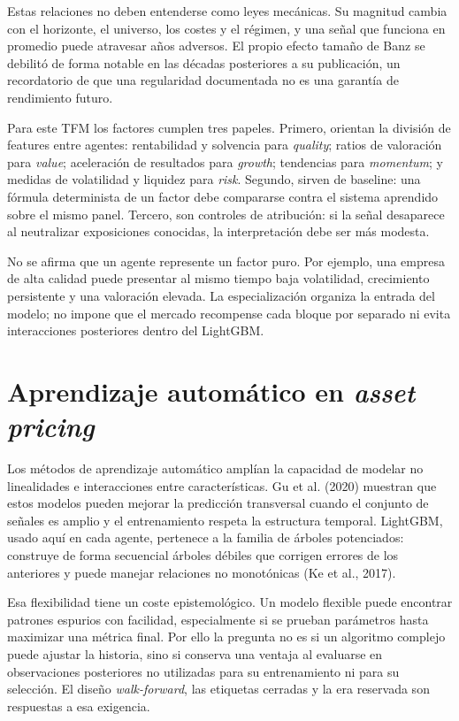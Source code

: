 Estas relaciones no deben entenderse como leyes mecánicas.
Su magnitud cambia con el horizonte, el universo, los costes y el régimen, y una señal que funciona
en promedio puede atravesar años adversos. El propio efecto tamaño de Banz se debilitó de forma
notable en las décadas posteriores a su publicación, un recordatorio de que una regularidad
documentada no es una garantía de rendimiento futuro.

Para este TFM los factores cumplen tres papeles. Primero, orientan la división de features entre
agentes: rentabilidad y solvencia para \textit{quality}; ratios de valoración para \textit{value};
aceleración de resultados para \textit{growth}; tendencias para \textit{momentum}; y medidas de
volatilidad y liquidez para \textit{risk}. Segundo, sirven de baseline: una fórmula determinista de
un factor debe compararse contra el sistema aprendido sobre el mismo panel. Tercero, son controles
de atribución: si la señal desaparece al neutralizar exposiciones conocidas, la interpretación debe
ser más modesta.

No se afirma que un agente represente un factor puro. Por ejemplo, una empresa de alta calidad puede
presentar al mismo tiempo baja volatilidad, crecimiento persistente y una valoración elevada. La
especialización organiza la entrada del modelo; no impone que el mercado recompense cada bloque por
separado ni evita interacciones posteriores dentro del LightGBM.

\section{Aprendizaje automático en \textit{asset pricing}}

Los métodos de aprendizaje automático amplían la capacidad de modelar no linealidades e
interacciones entre características. Gu et al. (2020) muestran que estos modelos pueden
mejorar la predicción transversal cuando el conjunto de señales es amplio y el entrenamiento respeta
la estructura temporal. LightGBM, usado aquí en cada agente, pertenece a la familia de árboles
potenciados: construye de forma secuencial árboles débiles que corrigen errores de los anteriores y
puede manejar relaciones no monotónicas (Ke et al., 2017).

Esa flexibilidad tiene un coste epistemológico. Un modelo flexible puede encontrar patrones espurios
con facilidad, especialmente si se prueban parámetros hasta maximizar una métrica final. Por ello la
pregunta no es si un algoritmo complejo puede ajustar la historia, sino si conserva una ventaja al
evaluarse en observaciones posteriores no utilizadas para su entrenamiento ni para su selección.
El diseño \textit{walk-forward}, las etiquetas cerradas y la era reservada son respuestas a esa
exigencia.

